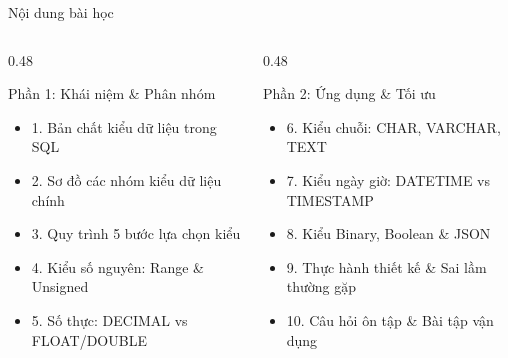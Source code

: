 \documentclass[aspectratio=169,11pt]{beamer}
\begin{document}
\begin{frame}{Nội dung bài học}
\begin{columns}[t]
  \begin{column}{0.48\textwidth}
    \begin{block}{Phần 1: Khái niệm \& Phân nhóm}
      \begin{itemize}\setlength{\itemsep}{2pt}
        \item 1. Bản chất kiểu dữ liệu trong SQL
        \item 2. Sơ đồ các nhóm kiểu dữ liệu chính
        \item 3. Quy trình 5 bước lựa chọn kiểu
        \item 4. Kiểu số nguyên: Range \& Unsigned
        \item 5. Số thực: DECIMAL vs FLOAT/DOUBLE
      \end{itemize}
    \end{block}
  \end{column}
  \begin{column}{0.48\textwidth}
    \begin{block}{Phần 2: Ứng dụng \& Tối ưu}
      \begin{itemize}\setlength{\itemsep}{2pt}
        \item 6. Kiểu chuỗi: CHAR, VARCHAR, TEXT
        \item 7. Kiểu ngày giờ: DATETIME vs TIMESTAMP
        \item 8. Kiểu Binary, Boolean \& JSON
        \item 9. Thực hành thiết kế \& Sai lầm thường gặp
        \item 10. Câu hỏi ôn tập \& Bài tập vận dụng
      \end{itemize}
    \end{block}
  \end{column}
\end{columns}
\end{frame}

\end{document}
